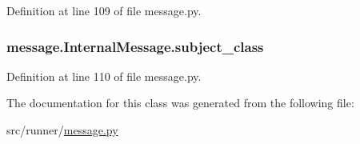 Definition at line 109 of file message.\+py.

\hypertarget{classmessage_1_1InternalMessage_ac242550d9ec846a4ab5dc57e4eaf7581}{}
\subsubsection[{subject\+\_\+class}]{\setlength{\rightskip}{0pt plus 5cm}message.\+Internal\+Message.\+subject\+\_\+class}\label{classmessage_1_1InternalMessage_ac242550d9ec846a4ab5dc57e4eaf7581}


Definition at line 110 of file message.\+py.



The documentation for this class was generated from the following file\+:\begin{DoxyCompactItemize}
\item 
src/runner/\hyperlink{message_8py}{message.\+py}\end{DoxyCompactItemize}
